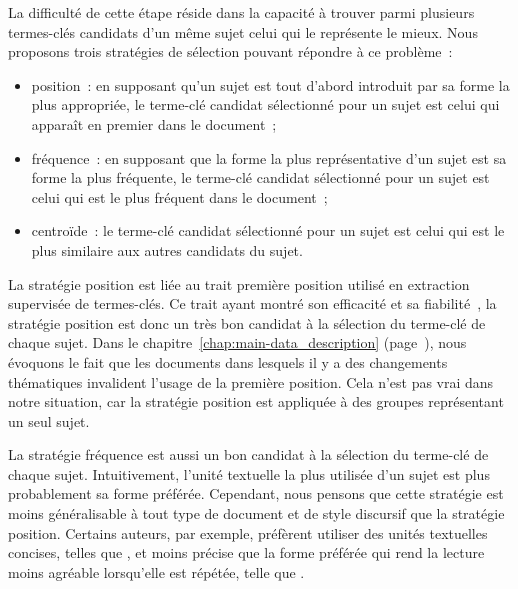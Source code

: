         La difficulté de cette étape réside dans la capacité à trouver parmi
        plusieurs termes-clés candidats d'un même sujet celui qui le représente
        le mieux. Nous proposons trois stratégies de sélection pouvant répondre
        à ce problème~:
        \begin{itemize}
          \item{position~: en supposant qu'un sujet est tout d'abord
                introduit par sa forme la plus appropriée, le terme-clé
                candidat sélectionné pour un sujet est celui qui apparaît en
                premier dans le document~;}
          \item{fréquence~: en supposant que la forme la plus représentative
                d'un sujet est sa forme la plus fréquente, le terme-clé candidat
                sélectionné pour un sujet est celui qui est le plus fréquent
                dans le document~;}
          \item{centroïde~: le terme-clé candidat sélectionné pour un sujet
                est celui qui est le plus similaire aux autres candidats du
                sujet.}
        \end{itemize}

        La stratégie position est liée au trait \og{}première position\fg{}
        utilisé en extraction supervisée de termes-clés. Ce trait ayant montré
        son efficacité et sa
        fiabilité~\cite{lim2012examiningthevalueofattributescores}, la stratégie
        position est donc un très bon candidat à la sélection du terme-clé de
        chaque sujet. Dans le chapitre~\ref{chap:main-data_description}
        (page~\pageref{chap:main-data_description}), nous évoquons le fait que
        les documents dans lesquels il y a des changements thématiques
        invalident l'usage de la première position. Cela n'est pas vrai dans
        notre situation, car la stratégie position est appliquée à des groupes
        représentant un seul sujet.

        La stratégie fréquence est aussi un bon candidat à la sélection du
        terme-clé de chaque sujet. Intuitivement, l'unité textuelle la plus
        utilisée d'un sujet est plus probablement sa forme préférée. Cependant,
        nous pensons que cette stratégie est moins généralisable à tout type de
        document et de style discursif que la stratégie position. Certains
        auteurs, par exemple, préfèrent utiliser des unités textuelles concises,
        telles que , et moins précise que la forme préférée qui
        rend la lecture moins agréable lorsqu'elle est répétée, telle que
        .


